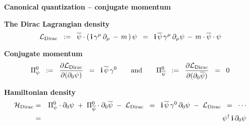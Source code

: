 \begin{frame}{\headingColor\bf\Large Canonical quantization -- conjugate momentum}

\small

\vskip 1.0cm
\textbf{The Dirac Lagrangian density}
\begin{equation*}
\mathcal{L}_{\textnormal{Dirac}}
\;\; := \;\;
	\overline{\psi}\cdot\left(\,\textnormal{\bf i}\,\gamma^{\mu}\,\partial_{\mu}\,-\,m\,\right)\psi
\;\; = \;\;
	\textnormal{\bf i}\,\overline{\psi}\,\gamma^{\mu}\,\partial_{\mu}\psi \,-\, m\cdot\overline{\psi}\cdot\psi
\end{equation*}

\vskip 0.5cm
\textbf{Conjugate momentum}
\begin{equation*}
\Pi_{\psi}^{0}
\;\; := \;\;
	\dfrac{\partial\mathcal{L}_{\textnormal{Dirac}}}{\partial(\partial_{0}\psi)}
\;\; = \;\;
	\textnormal{\bf i}\,\overline{\psi}\,\gamma^{0}
\quad\quad\textnormal{and}\quad\quad
\Pi_{\overline{\psi}}^{0}
\;\; := \;\;
	\dfrac{\partial\mathcal{L}_{\textnormal{Dirac}}}{\partial(\partial_{0}\overline{\psi})}
\;\; = \;\;
	0
\end{equation*}

\vskip 0.5cm
\textbf{Hamiltonian density}
\begin{eqnarray*}
\mathcal{H}_{\textnormal{Dirac}}
& = &
	\Pi_{\psi}^{0}\cdot\partial_{0}\psi
	\;+\; \Pi_{\overline{\psi}}^{0}\cdot\partial_{0}\overline{\psi}
	\;-\; \mathcal{L}_{\textnormal{Dirac}}
\;\; = \;\;
	\textnormal{\bf i}\,\overline{\psi}\,\gamma^{0}\,\partial_{0}\psi
	\;-\; \mathcal{L}_{\textnormal{Dirac}}
\;\; = \;\;
	\cdots
\\
& = &
	\psi^{\dagger}\,\textnormal{\bf i}\,\partial_{0}\psi
\end{eqnarray*}

\end{frame}
\normalsize

